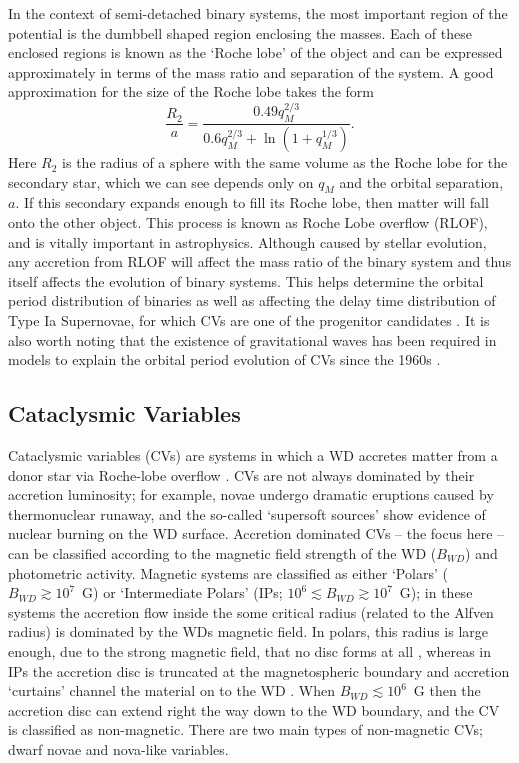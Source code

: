 In the context of semi-detached binary systems, the most important region of the 
potential is the dumbbell shaped region enclosing the masses. Each of these
enclosed regions is known as the `Roche lobe' of the object and can be expressed 
approximately in terms of the mass ratio and separation of the system. A good approximation
for the size of the Roche lobe takes the form \citep{eggleton1983}
\begin{equation}
\frac{R_2}{a} = \frac{0.49 q_M^{2/3}}{0.6q_M^{2/3} + \ln(1+q_M^{1/3})}.
\label{eq:roche2}
\end{equation} 
Here $R_2$ is the radius of a sphere with the same volume as the Roche lobe for the
secondary star, which we can see depends only on $q_M$ and the orbital separation, 
$a$. If this secondary expands enough to fill its Roche lobe, then matter
will fall onto the other object. This process is known as Roche Lobe overflow (RLOF),
and is vitally important in astrophysics. Although caused by stellar evolution,
any accretion from RLOF will affect the mass ratio of the binary system 
and thus itself affects the evolution
of binary systems. This helps determine the orbital period
distribution of binaries \citep[e.g.][]{knigge2011_evo} 
as well as affecting the delay time distribution
of Type Ia Supernovae, for which CVs are one of the progenitor candidates 
\citep[e.g.][]{wang2012}.
It is also worth noting that the existence of gravitational waves has been 
required in models to explain the orbital period evolution of CVs since
the 1960s \citep{kraft1962}. 


\subsection{Cataclysmic Variables}

Cataclysmic variables (CVs) are systems in which a WD
accretes matter from a donor star via Roche-lobe overflow 
\citep[see the `CV bible', ][]{warnerbook}. 
CVs are not always dominated by their accretion luminosity; 
for example, novae undergo dramatic eruptions caused
by thermonuclear runaway, and the so-called `supersoft sources' show evidence
of nuclear burning on the WD surface.
Accretion dominated CVs -- the focus here -- can be classified according to the 
magnetic field strength of the WD ($B_{WD} $) and photometric activity. 
Magnetic systems are classified as either `Polars' ($B_{WD} \gtrsim 10^7$~G)
or `Intermediate Polars' (IPs; $10^6 \lesssim B_{WD}  \gtrsim 10^7$~G);
in these systems the accretion flow inside the some critical radius 
(related to the Alfven radius)
is dominated by the WDs magnetic field. 
In polars, this radius is large enough, due to the strong magnetic field,
that no disc forms at all \citep{liebert1985}, whereas in IPs the accretion
disc is truncated at the magnetospheric boundary and accretion `curtains'
channel the material on to the WD \citep[e.g.][]{patterson1994,evans2004}.
When $B_{WD} \lesssim 10^6$~G then the accretion disc can extend right the
way down to the WD boundary, and the CV is classified as non-magnetic.
There are two main types of non-magnetic CVs; dwarf novae and nova-like
variables.

